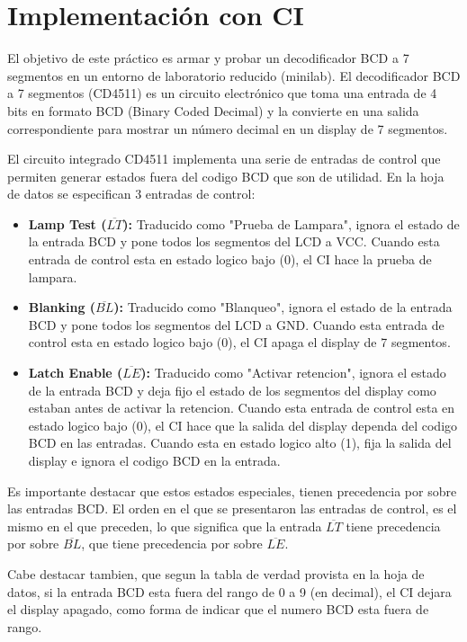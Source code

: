 \chapter{Implementación con CI}
  El objetivo de este práctico es armar y probar un decodificador BCD a 7 segmentos en un entorno de laboratorio
  reducido (minilab). El decodificador BCD a 7 segmentos (CD4511) es un circuito electrónico que toma una entrada de 4
  bits en formato BCD (Binary Coded Decimal) y la convierte en una salida correspondiente para mostrar un número decimal
  en un display de 7 segmentos.

  El circuito integrado CD4511 implementa una serie de entradas de control que permiten generar estados fuera del codigo
  BCD que son de utilidad. En la hoja de datos se especifican 3 entradas de control:
  \begin{itemize}
    \item \textbf{Lamp Test ($\overline{LT}$):} Traducido como "Prueba de Lampara", ignora el estado de la entrada BCD y pone todos
    los segmentos del LCD a VCC. Cuando esta entrada de control esta en estado logico bajo (0), el CI hace la prueba de
    lampara.
    \item \textbf{Blanking ($\overline{BL}$):} Traducido como "Blanqueo", ignora el estado de la entrada BCD y pone
    todos los segmentos del LCD a GND. Cuando esta entrada de control esta en estado logico bajo (0), el CI apaga el
    display de 7 segmentos.
    \item \textbf{Latch Enable ($\overline{LE}$):} Traducido como "Activar retencion", ignora el estado de la entrada
    BCD y deja fijo el estado de los segmentos del display como estaban antes de activar la retencion. Cuando esta
    entrada de control esta en estado logico bajo (0), el CI hace que la salida del display dependa del codigo BCD en
    las entradas. Cuando esta en estado logico alto (1), fija la salida del display e ignora el codigo BCD en la
    entrada.
  \end{itemize}

  Es importante destacar que estos estados especiales, tienen precedencia por sobre las entradas BCD. El orden en el que
  se presentaron las entradas de control, es el mismo en el que preceden, lo que significa que la entrada
  $\overline{LT}$ tiene precedencia por sobre $\overline{BL}$, que tiene precedencia por sobre $\overline{LE}$.

  Cabe destacar tambien, que segun la tabla de verdad provista en la hoja de datos, si la entrada BCD esta fuera del
  rango de 0 a 9 (en decimal), el CI dejara el display apagado, como forma de indicar que el numero BCD esta fuera de
  rango.

